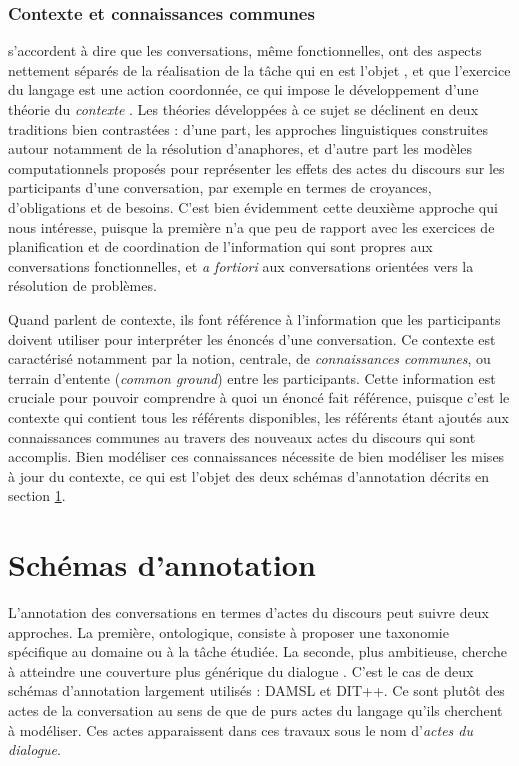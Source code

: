 \documentclass[10pt,a4paper,twoside]{article}
\begin{document}
\subsubsection{Contexte et connaissances communes}

\citeauthor{poesio1997conversational} s'accordent à dire que les conversations, même fonctionnelles, ont des aspects nettement séparés de la réalisation de la tâche qui en est l'objet \cite{poesio1998towards}, et que l'exercice du langage est une action coordonnée, ce qui impose le développement d'une théorie du \textit{contexte} \cite{poesio1997conversational}. Les théories développées à ce sujet se déclinent en deux traditions bien contrastées : d'une part, les approches linguistiques construites autour notamment de la résolution d'anaphores, et d'autre part les modèles computationnels proposés pour représenter les effets des actes du discours sur les participants d'une conversation, par exemple en termes de croyances, d'obligations et de besoins. C'est bien évidemment cette deuxième approche qui nous intéresse, puisque la première n'a que peu de rapport avec les exercices de planification et de coordination de l'information qui sont propres aux conversations fonctionnelles, et \textit{a fortiori} aux conversations orientées vers la résolution de problèmes.

Quand \citeauthor{poesio1997conversational} parlent de contexte, ils font référence à l'information que les participants doivent utiliser pour interpréter les énoncés d'une conversation. Ce contexte est caractérisé notamment par la notion, centrale, de \textit{connaissances communes}, ou \og terrain d'entente \fg{} (\textit{common ground}) entre les participants. Cette information est cruciale pour pouvoir comprendre à quoi un énoncé fait référence, puisque c'est le contexte qui contient tous les référents disponibles, les référents étant ajoutés aux connaissances communes au travers des nouveaux actes du discours qui sont accomplis. Bien modéliser ces connaissances nécessite de bien modéliser les mises à jour du contexte, ce qui est l'objet des deux schémas d'annotation décrits en section \ref{sec:annotation_schemes}.

\section{Schémas d'annotation}
\label{sec:annotation_schemes}

L'annotation des conversations en termes d'actes du discours peut suivre deux approches. La première, ontologique, consiste à proposer une taxonomie spécifique au domaine ou à la tâche étudiée. La seconde, plus ambitieuse, cherche à atteindre une couverture plus générique du dialogue \cite{leech2003generic}. C'est le cas de deux schémas d'annotation largement utilisés : DAMSL et DIT++. Ce sont plutôt des actes de la conversation au sens de \citeauthor{traum1992conversation} que de purs actes du langage qu'ils cherchent à modéliser. Ces actes apparaissent dans ces travaux sous le nom d'\textit{actes du dialogue}.
\end{document}
